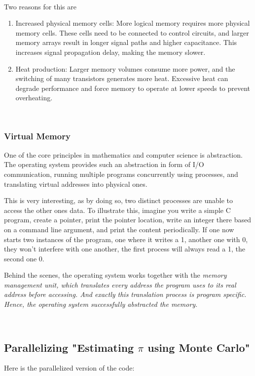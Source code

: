 \documentclass[../../main.tex]{subfiles}
\begin{document}
~\\
Two reasons for this are
\begin{enumerate}
    \item Increased physical memory cells: More logical memory requires more physical memory cells. These cells need to be connected to control circuits, and larger memory arrays result in longer signal paths and higher capacitance. This increases signal propagation delay, making the memory slower.
    \item Heat production: Larger memory volumes consume more power, and the switching of many transistors generates more heat. Excessive heat can degrade performance and force memory to operate at lower speeds to prevent overheating.
\end{enumerate}

~\\
\subsubsection{Virtual Memory}
One of the core principles in mathematics and computer science is abstraction.
The operating system provides such an abstraction in form of I/O communication, running multiple programs concurrently using processes, and translating virtual addresses into physical ones.

This is very interesting, as by doing so, two distinct processes are unable to access the other ones data.
To illustrate this, imagine you write a simple C program, create a pointer, print the pointer location, write an integer there based on a command line argument, and print the content periodically.
If one now starts two instances of the program, one where it writes a 1, another one with 0, they won't interfere with one another, the first process will always read a 1, the second one 0.

Behind the scenes, the operating system works together with the \em memory management unit\em, which translates every address the program uses to its real address before accessing.
And exactly this translation process is program specific.
Hence, the operating system successfully abstracted the memory.

~\\
\newpage
\subsection{Parallelizing "Estimating $\pi$ using Monte Carlo"}
Here is the parallelized version of the code:
\end{document}
